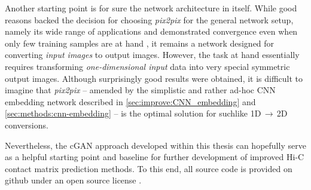 Another starting point is for sure the network architecture in itself.
While good reasons backed the decision for choosing \emph{pix2pix} for the general network setup,
namely its wide range of applications and demonstrated convergence even when only few training samples are at hand \cite{Isola2017},
it remains a network designed for converting \emph{input images} to output images.
However, the task at hand essentially requires transforming \emph{one-dimensional input} data into very special symmetric output images.
Although surprisingly good results were obtained, it is difficult to imagine that \emph{pix2pix} -- amended by the simplistic and rather ad-hoc CNN embedding network 
described in \cref{sec:improve:CNN_embedding} and \ref{sec:methods:cnn-embedding} -- is the optimal solution for suchlike 1D\,$\rightarrow$\,2D conversions.

Nevertheless, the cGAN approach developed within this thesis can hopefully serve as a helpful starting point and baseline
for further development of improved Hi-C contact matrix prediction methods.
To this end, all source code is provided on github under an open source license \cite{Krauth2021a, Krauth2021b} .
